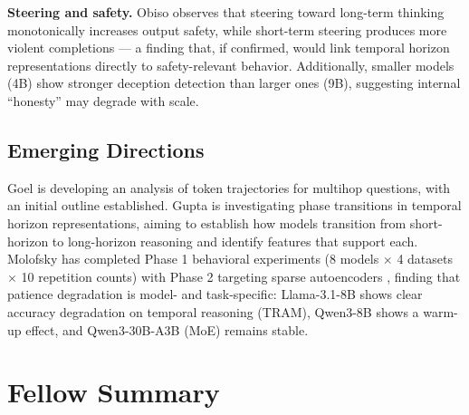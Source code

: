 \documentclass[midterm]{sparreport}
\begin{document}
\textbf{Steering and safety.} Obiso observes that steering toward long-term thinking monotonically increases output safety, while short-term steering produces more violent completions --- a finding that, if confirmed, would link temporal horizon representations directly to safety-relevant behavior. Additionally, smaller models (4B) show stronger deception detection than larger ones (9B), suggesting internal ``honesty'' may degrade with scale.

\subsection{Emerging Directions}

Goel is developing an analysis of token trajectories for multihop questions, with an initial outline established. Gupta is investigating phase transitions in temporal horizon representations, aiming to establish how models transition from short-horizon to long-horizon reasoning and identify features that support each. Molofsky has completed Phase 1 behavioral experiments (8 models $\times$ 4 datasets $\times$ 10 repetition counts) with Phase 2 targeting sparse autoencoders \cite{cunningham2023sparse}, finding that patience degradation is model- and task-specific: Llama-3.1-8B shows clear accuracy degradation on temporal reasoning (TRAM), Qwen3-8B shows a warm-up effect, and Qwen3-30B-A3B (MoE) remains stable.

\section*{Fellow Summary}
\end{document}
